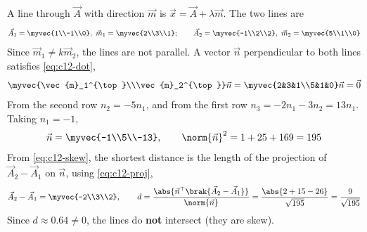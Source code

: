\begin{enumerate}[label=\thesubsection.\arabic*., ref=\thesubsection.\theenumi]
\solution
A line through $\vec{A}$ with direction $\vec{m}$ is $\vec{x}=\vec{A}+\lambda\vec{m}$. The two lines are
\begin{align}
\vec{A}_1 = \myvec{1\\-1\\0},\ \vec{m}_1 = \myvec{2\\3\\1};\qquad
\vec{A}_2 = \myvec{-1\\2\\2},\ \vec{m}_2 = \myvec{5\\1\\0}
\label{eq:c12-q30-lines}
\end{align}
Since $\vec{m}_1\neq k\vec{m}_2$, the lines are not parallel. A vector $\vec{n}$ perpendicular to both lines satisfies \eqref{eq:c12-dot},
\begin{align}
\myvec{\vec{m}_1^{\top}\\\vec{m}_2^{\top}}\vec{n} = \myvec{2&3&1\\5&1&0}\vec{n} = \vec{0}
\label{eq:c12-q30-null}
\end{align}
From the second row $n_2=-5n_1$, and from the first row $n_3=-2n_1-3n_2=13n_1$. Taking $n_1=-1$,
\begin{align}
\vec{n} = \myvec{-1\\5\\-13},\qquad \norm{\vec{n}}^2 = 1+25+169 = 195
\label{eq:c12-q30-n}
\end{align}
From \eqref{eq:c12-skew}, the shortest distance is the length of the projection of $\vec{A}_2-\vec{A}_1$ on $\vec{n}$, using \eqref{eq:c12-proj},
\begin{align}
\vec{A}_2-\vec{A}_1 = \myvec{-2\\3\\2},\qquad
d = \frac{\abs{\vec{n}^{\top}\brak{\vec{A}_2-\vec{A}_1}}}{\norm{\vec{n}}}
= \frac{\abs{2+15-26}}{\sqrt{195}} = \frac{9}{\sqrt{195}}
\label{eq:c12-q30-d}
\end{align}
Since $d\approx 0.64\neq 0$, the lines do \textbf{not} intersect (they are skew).
 

\end{enumerate}

